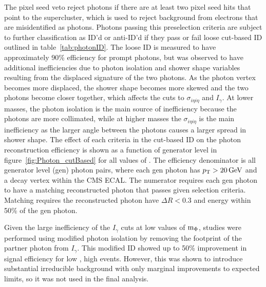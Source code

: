 The pixel seed veto reject photons if there are at least two pixel seed hits that point to the supercluster, which is used to reject background from electrons that are misidentified as photons. Photons passing this preselection criteria are subject to further classification as ID'd or anti-ID'd if they pass or fail loose cut-based ID outlined in table~\ref{tab:photonID}. The loose ID is measured to have approximately 90\% efficiency for prompt photons, but was observed to have additional inefficiencies due to photon isolation and shower shape variables resulting from the displaced signature of the two photons. As the photon vertex becomes more displaced, the shower shape becomes more skewed and the two photons become closer together, which affects the cuts to $\sigma_{i\eta i\eta}$ and $I_\gamma$. At lower masses, the photon isolation is the main source of inefficiency because the photons are more collimated, while at higher masses the $\sigma_{i\eta i\eta}$ is the main inefficiency as the larger angle between the photons causes a larger spread in shower shape. The effect of each criteria in the cut-based ID on the photon reconstruction efficiency is shown as a function of generator level \lxy in figure~\ref{fig:Photon_cutBased} for all values of \mphi. The efficiency denominator is all generator level (gen) photon pairs, where each gen photon has $p_{\mathrm{T}}>20\,\text{Ge\hspace{-.08em}V}$ and a decay vertex within the CMS ECAL. The numerator requires each gen photon to have a matching reconstructed photon that passes given selection criteria. Matching requires the reconstructed photon have $\Delta R < 0.3$ and energy within 50\% of the gen photon.

Given the large inefficiency of the $I_\gamma$ cuts at low values of $\text{m}_\Phi$, studies were performed using modified photon isolation by removing the footprint of the partner photon from $I_\gamma$. This modified ID showed up to 50\% improvement in signal efficiency for low \mphi, high \lxy events. However, this was shown to introduce substantial irreducible background with only marginal improvements to expected limits, so it was not used in the final analysis.


